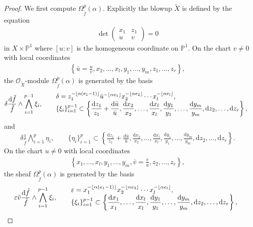\documentclass[pdftex]{sigma}
\newcommand{\PP}{\mathbb{P}}
\newcommand{\sO}{\mathscr{O}}
\newcommand{\de}{\mathrm{d}}
\newcommand{\flr}[1]{\lfloor #1 \rfloor}
\begin{document}
\begin{proof}
We first compute $\Omega_{\tilde{f}}^p(\alpha)$. Explicitly the blowup $\widetilde{X}$ is defined by the equation
\begin{gather*} \det \begin{pmatrix}
x_1 & z_1 \\
u & v
\end{pmatrix}
= 0 \end{gather*}
in $X\times\PP^1$ where $[u:v]$ is the homogeneous coordinate on $\PP^1$. On the chart $v\neq 0$ with local coordinates
\begin{gather*} \left\{ \bar{u} = \frac{u}{v},x_2,\dots, x_l, y_1, \dots, y_m,z_1, \dots, z_r \right\}, \end{gather*}
the $\sO_{\widetilde{X}}$-module $\Omega_{\tilde{f}}^p(\alpha)$ is generated by the basis
\begin{gather}\label{eq:chart-u-1}
\delta\frac{\de \tilde{f}}{\tilde{f}}\wedge\bigwedge_{i=1}^{p-1}\xi_i,
\qquad\begin{array}{@{}l}
\delta = z_1^{-\flr{\alpha(e_1-1)}}\bar{u}^{-\flr{\alpha e_1}}	x_2^{-\flr{\alpha e_2}}\cdots x_l^{-\flr{\alpha e_l}}, \\
\displaystyle \{\xi_i \}_{i=1}^{p-1} \subset \left\{ \frac{\de z_1}{z_1} + \frac{\de\bar{u}}{\bar{u}},\frac{\de x_2}{x_2},\dots, \frac{\de x_l}{x_l},\frac{\de y_1}{y_1},\dots, \frac{\de y_m}{y_m}, \de z_2,\dots, \de z_r \right\},
\end{array}
\end{gather}
and
\begin{gather}\label{eq:chart-u-2}
\delta\frac{1}{\tilde{f}}\bigwedge_{i=1}^p\eta_i,\qquad
\{\eta_i \}_{i=1}^p \subset\left\{ \frac{\de z_1}{z_1} + \frac{\de\bar{u}}{\bar{u}},\frac{\de x_2}{x_2},\dots, \frac{\de x_l}{x_l},\frac{\de y_1}{y_1},\dots, \frac{\de y_m}{y_m},\de z_2,\dots, \de z_r \right\}.
\end{gather}
On the chart $u\neq 0$ with local coordinates
\begin{gather*} \left\{
x_1,\dots, x_l, y_1, \dots, y_m, \bar{v} = \frac{v}{u},z_2, \dots, z_r \right\}, \end{gather*}
the sheaf $\Omega_{\tilde{f}}^p(\alpha)$ is generated by the basis
\begin{gather}\label{eq:chart-v-1}
\varepsilon\bar{v}\frac{\de \tilde{f}}{\tilde{f}}\wedge\bigwedge_{i=1}^{p-1}\xi_i,
\qquad\begin{array}{@{}l}
\varepsilon = x_1^{-\flr{\alpha(e_1-1)}}	x_2^{-\flr{\alpha e_2}}\cdots x_l^{-\flr{\alpha e_l}}, \\
\displaystyle\{\xi_i \}_{i=1}^{p-1} \subset \left\{ \frac{\de x_1}{x_1},\dots, \frac{\de x_l}{x_l},\frac{\de y_1}{y_1},\dots, \frac{\de y_m}{y_m},\de z_2,\dots, \de z_r \right\},

\end{array}
\end{gather}
\end{proof}
\end{document}
